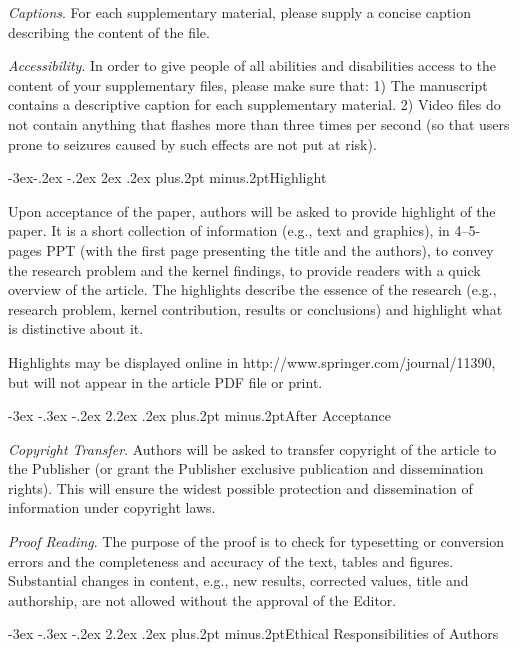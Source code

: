 \documentclass[twoside]{article}
\makeatletter
\def\section{\@startsection{section}{1}{\z@}%
 {-3ex \@plus -.3ex \@minus -.2ex}%
 {2.2ex \@plus.2ex}%
{\normalfont\normalsize\protect\baselineskip=14.5pt plus.2pt minus.2pt\bfseries}}
\def\subsection{\@startsection{subsection}{2}{\z@}%
 {-3ex\@plus -.2ex \@minus -.2ex}%
 {2ex \@plus.2ex}%
{\normalfont\normalsize\protect\baselineskip=12.5pt plus.2pt minus.2pt\bfseries}}
\makeatother
\begin{document}
\begin{multicols}{2}
{\it Captions}. For each supplementary material, please supply a concise caption describing the content of the file.

{\it Accessibility}. In order to give people of all abilities and disabilities access to the content of your supplementary files, please make sure that: 1) The manuscript contains a descriptive caption for each supplementary material. 2) Video files do not contain anything that flashes more than three times per second (so that users prone to seizures caused by such effects are not put at risk).

\subsection{Highlight}

Upon acceptance of the paper, authors will be asked to provide highlight of the paper. It is a short collection of information (e.g., text and graphics), in 4--5-pages PPT (with the first page presenting the title and the authors), to convey the research problem and the kernel findings, to provide readers with a quick overview of the article. The highlights describe the essence of the research (e.g., research problem, kernel contribution, results or conclusions) and highlight what is distinctive about it.

Highlights may be displayed online in http://www.springer.com/journal/11390, but will not appear in the article PDF file or print.

\section{After Acceptance}

{\it Copyright Transfer}. Authors will be asked to transfer copyright of the article to the Publisher (or grant the Publisher exclusive publication and dissemination rights). This will ensure the widest possible protection and dissemination of information under copyright laws.

{\it Proof Reading}. The purpose of the proof is to check for typesetting or conversion errors and the completeness and accuracy of the text, tables and figures. Substantial changes in content, e.g., new results, corrected values, title and authorship, are not allowed without the approval of the Editor.

\section{Ethical Responsibilities of Authors}


\end{multicols}
\end{document}
